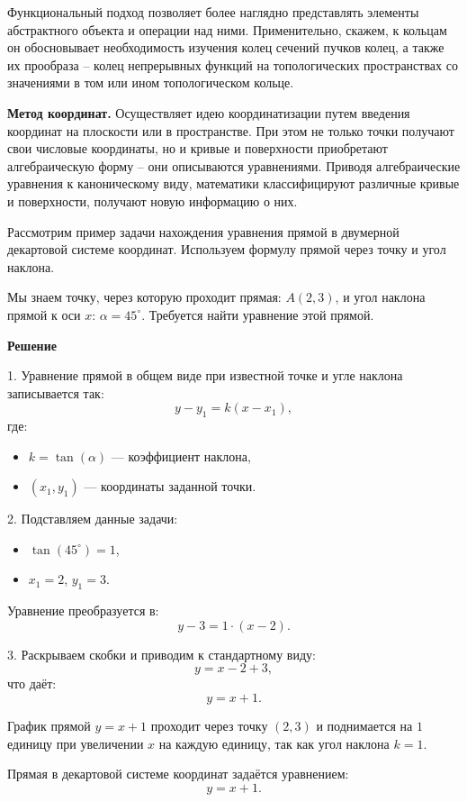Функциональный подход позволяет более наглядно представлять элементы абстрактного объекта и операции над ними. Применительно, скажем, к кольцам он обосновывает необходимость изучения колец сечений пучков колец, а также их прообраза – колец непрерывных функций на топологических пространствах со значениями в том или ином топологическом кольце. 

\textbf{Метод координат.} Осуществляет идею координатизации путем введения координат на плоскости или в пространстве. При этом не только точки получают свои числовые координаты, но и кривые и поверхности приобретают алгебраическую форму – они описываются уравнениями. Приводя алгебраические уравнения к каноническому виду, математики классифицируют различные кривые и поверхности, получают новую информацию о них.

Рассмотрим пример задачи нахождения уравнения прямой в двумерной декартовой системе координат. Используем формулу прямой через точку и угол наклона.


Мы знаем точку, через которую проходит прямая: $A(2, 3)$, и угол наклона прямой к оси $x$: $\alpha = 45^\circ$. Требуется найти уравнение этой прямой.

\textbf{Решение}

1. Уравнение прямой в общем виде при известной точке и угле наклона записывается так:
\[
y - y_1 = k(x - x_1),
\]
где:
\begin{itemize}
    \item $k = \tan(\alpha)$ — коэффициент наклона,
    \item $(x_1, y_1)$ — координаты заданной точки.
\end{itemize}

2. Подставляем данные задачи:
\begin{itemize}
    \item $\tan(45^\circ) = 1$,
    \item $x_1 = 2$, $y_1 = 3$.
\end{itemize}

Уравнение преобразуется в:
\[
y - 3 = 1 \cdot (x - 2).
\]

3. Раскрываем скобки и приводим к стандартному виду:
\[
y = x - 2 + 3,
\]
что даёт:
\[
y = x + 1.
\]

График прямой $y = x + 1$ проходит через точку $(2, 3)$ и поднимается на $1$ единицу при увеличении $x$ на каждую единицу, так как угол наклона $k = 1$.

Прямая в декартовой системе координат задаётся уравнением:
\[
y = x + 1.
\]

